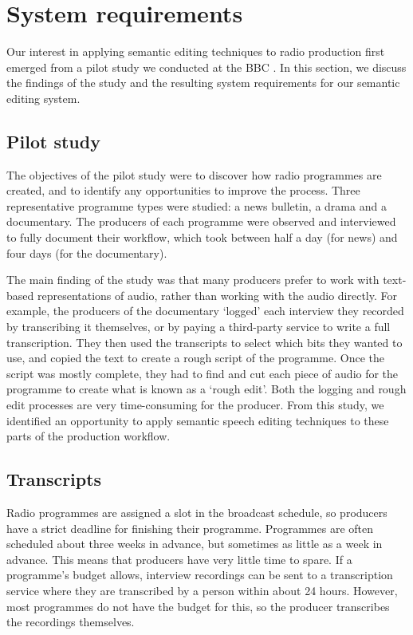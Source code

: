

\section{System requirements}\label{sec:requirements}
Our interest in applying semantic editing techniques to radio production first
emerged from a pilot study we conducted at the BBC \citep{Baume2015}.  In this
section, we discuss the findings of the study and the resulting system
requirements for our semantic editing system.

\subsection{Pilot study}
The objectives of the pilot study were to discover how
radio programmes are created, and to identify any opportunities to improve the
process.  Three representative programme types were studied: a
news bulletin, a drama and a documentary. The producers of each programme were
observed and interviewed to fully document their workflow, which took between
half a day (for news) and four days (for the documentary).

The main finding of the study was that many producers prefer to work with
text-based representations of audio, rather than working with the audio
directly. For example, the producers of the documentary `logged' each interview
they recorded by transcribing it themselves, or by
paying a third-party service to write a full transcription.  They then used the
transcripts to select which bits they wanted to use, and copied the text to
create a rough script of the programme. Once the script was mostly complete,
they had to find and cut each piece of audio for the programme to create what
is known as a `rough edit'.  Both the logging and rough edit processes are very
time-consuming for the producer.  From this study, we identified an opportunity
to apply semantic speech editing techniques to these parts of the production
workflow.

\subsection{Transcripts}
Radio programmes are assigned a slot in the broadcast schedule, so producers
have a strict deadline for finishing their programme. Programmes are often
scheduled about three weeks in advance, but sometimes as little as a week in
advance. This means that producers have very little time to spare. If a
programme's budget allows, interview recordings can be sent to a transcription
service where they are transcribed by a person within about 24 hours. However,
most programmes do not have the budget for this, so the producer transcribes
the recordings themselves.

